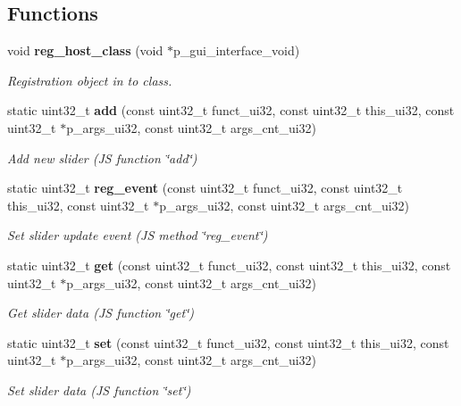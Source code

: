 \subsection*{Functions}
\begin{DoxyCompactItemize}
\item 
void \textbf{ reg\+\_\+host\+\_\+class} (void $\ast$p\+\_\+gui\+\_\+interface\+\_\+void)
\begin{DoxyCompactList}\small\item\em Registration object in to class. \end{DoxyCompactList}\item 
static uint32\+\_\+t \textbf{ add} (const uint32\+\_\+t funct\+\_\+ui32, const uint32\+\_\+t this\+\_\+ui32, const uint32\+\_\+t $\ast$p\+\_\+args\+\_\+ui32, const uint32\+\_\+t args\+\_\+cnt\+\_\+ui32)
\begin{DoxyCompactList}\small\item\em Add new slider (JS function \char`\"{}add\char`\"{}) \end{DoxyCompactList}\item 
static uint32\+\_\+t \textbf{ reg\+\_\+event} (const uint32\+\_\+t funct\+\_\+ui32, const uint32\+\_\+t this\+\_\+ui32, const uint32\+\_\+t $\ast$p\+\_\+args\+\_\+ui32, const uint32\+\_\+t args\+\_\+cnt\+\_\+ui32)
\begin{DoxyCompactList}\small\item\em Set slider update event (JS method \char`\"{}reg\+\_\+event\char`\"{}) \end{DoxyCompactList}\item 
static uint32\+\_\+t \textbf{ get} (const uint32\+\_\+t funct\+\_\+ui32, const uint32\+\_\+t this\+\_\+ui32, const uint32\+\_\+t $\ast$p\+\_\+args\+\_\+ui32, const uint32\+\_\+t args\+\_\+cnt\+\_\+ui32)
\begin{DoxyCompactList}\small\item\em Get slider data (JS function \char`\"{}get\char`\"{}) \end{DoxyCompactList}\item 
static uint32\+\_\+t \textbf{ set} (const uint32\+\_\+t funct\+\_\+ui32, const uint32\+\_\+t this\+\_\+ui32, const uint32\+\_\+t $\ast$p\+\_\+args\+\_\+ui32, const uint32\+\_\+t args\+\_\+cnt\+\_\+ui32)
\begin{DoxyCompactList}\small\item\em Set slider data (JS function \char`\"{}set\char`\"{}) \end{DoxyCompactList}\item 

\end{DoxyCompactItemize}
